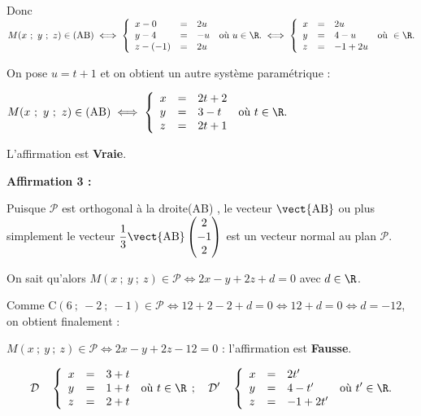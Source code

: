 Donc $M(x~;~y~;~z) \in (\text{AB}) \iff \left\{\begin{array}{l c l}
x - 0&=& 2u\\
y - 4&=&  - u\\
z - (-1)&=&2u
\end{array}\right. \:\text{où } u \in \R. \iff \left\{\begin{array}{l c l}
x &=& 2u\\
y &=&4  - u\\
z &=&- 1 + 2u
\end{array}\right. \:\text{où } \in \R.$

On pose $u = t + 1$ et on obtient un autre système paramétrique :

$M(x~;~y~;~z) \in (\text{AB}) \iff \left\{\begin{array}{l c l}
x&=&2t + 2\\y &=& 3 - t\\z&=&2t + 1
\end{array}\right. \:\text{où } t \in \R.$

L'affirmation est \textbf{Vraie}.

\medskip

\textbf{Affirmation 3 :} 

Puisque $\mathcal{P}$ est orthogonal à la droite(AB) , le vecteur $\vect{\text{AB}}$ ou plus simplement le vecteur $\dfrac13\vect{\text{AB}}\begin{pmatrix}2\\-1\\2\end{pmatrix}$ est un vecteur normal au plan $\mathcal{P}$.

On sait qu'alors $M(x~;~y~;~z) \in \mathcal{P} \iff 2x - y + 2z + d = 0$ avec $d \in \R$.

Comme C$(6~;~-2~;~-1) \in \mathcal{P} \iff 12  + 2 - 2 + d = 0\iff 12 + d = 0 \iff d = - 12$, on obtient finalement :

$M(x~;~y~;~z) \in \mathcal{P} \iff 2x - y + 2z - 12= 0$ : l'affirmation  est \textbf{Fausse}.

\bigskip



\[\mathcal{D}\quad \left\{\begin{array}{l c l}
x&=&3+t\\
y&=&1+t\\
z&=&2+t
\end{array}\right. \:\text{où } t \in \R \:\:;\quad
\mathcal{D}'\quad \left\{\begin{array}{l c l}
x&= &2t'\\
y&=&4 - t'\\
z&=&-1 + 2t'
\end{array}\right. \:\text{où } t' \in \R.\]

